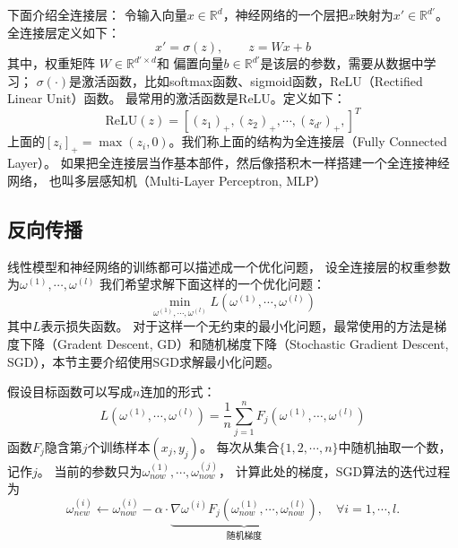 \documentclass[AutoFakeBold]{LZUThesis}
\begin{document}
下面介绍全连接层：
令输入向量$x \in \mathbb{R}^d$，神经网络的一个层把$x$映射为$x' \in \mathbb{R}^{d'}$。全连接层定义如下：
\begin{equation}
  x' = \sigma(z), \qquad z = W x + b
\end{equation}
其中，权重矩阵 $W \in \mathbb{R}^{d' \times d}$和
偏置向量$b \in \mathbb{R}^{d'}$是该层的参数，需要从数据中学习；
$\sigma(\cdot)$是激活函数，比如softmax函数、sigmoid函数，ReLU（Rectified Linear Unit）函数。
最常用的激活函数是ReLU。定义如下：
\begin{equation}
  \mathrm{ReLU}(z) = [(z_1)_+, (z_2)_+, \cdots, (z_{d'})_+,]^T
\end{equation}
上面的$[z_i]_+ = \max(z_i, 0)$。我们称上面的结构为全连接层（Fully Connected Layer）。
如果把全连接层当作基本部件，然后像搭积木一样搭建一个全连接神经网络，
也叫多层感知机（Multi-Layer Perceptron, MLP）

\subsection{反向传播}
线性模型和神经网络的训练都可以描述成一个优化问题，
设全连接层的权重参数为$\omega^{(1)}, \cdots, \omega^{(l)}$
我们希望求解下面这样的一个优化问题：
\begin{equation}
  \min_{\omega^{(1)}, \cdots, \omega^{(l)}} L(\omega^{(1)}, \cdots, \omega^{(l)})
\end{equation}
其中$L$表示损失函数。
对于这样一个无约束的最小化问题，最常使用的方法是梯度下降（Gradent Descent, GD）和随机梯度下降（Stochastic Gradient Descent, SGD），本节主要介绍使用SGD求解最小化问题。

假设目标函数可以写成$n$连加的形式：
\begin{equation}
  L(\omega^{(1)}, \cdots, \omega^{(l)}) = \frac1n \sum_{j = 1}^{n}
  F_j (\omega^{(1)}, \cdots, \omega^{(l)})
\end{equation}
函数$F_j$隐含第$j$个训练样本$(x_j, y_j)$。
每次从集合$\{ 1,2,\cdots,n \}$中随机抽取一个数，记作$j$。
当前的参数只为$\omega_{now}^{(1)}, \cdots, \omega_{now}^{(j)}$，
计算此处的梯度，SGD算法的迭代过程为
\begin{equation}
  \omega_{new}^{(i)} \leftarrow \omega_{now}^{(i)} - 
  \alpha \cdot \underbrace{
  \nabla{\omega^{(i)}} F_j \left( \omega_{now}^{(1)}, 
\cdots, \omega_{now}^{(l)} \right)}_\text{随机梯度},
  \quad \forall i = 1, \cdots, l.
\end{equation}
\end{document}
